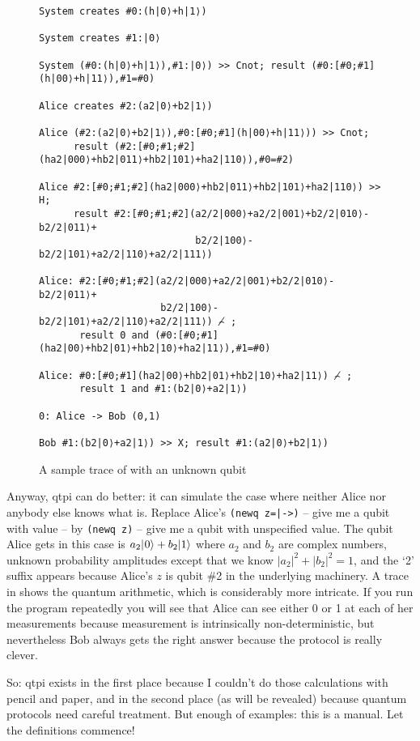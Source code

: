 \documentclass[11pt,a4paper]{article}
\newcommand{\verbtt}[1]{\texttt{\small{}#1}}
\begin{document}
\begin{figure}
\centering
\begin{verbatim}
System creates #0:(h|0⟩+h|1⟩)

System creates #1:|0⟩

System (#0:(h|0⟩+h|1⟩),#1:|0⟩) >> Cnot; result (#0:[#0;#1](h|00⟩+h|11⟩),#1=#0)

Alice creates #2:(a2|0⟩+b2|1⟩)

Alice (#2:(a2|0⟩+b2|1⟩),#0:[#0;#1](h|00⟩+h|11⟩)) >> Cnot; 
      result (#2:[#0;#1;#2](ha2|000⟩+hb2|011⟩+hb2|101⟩+ha2|110⟩),#0=#2)

Alice #2:[#0;#1;#2](ha2|000⟩+hb2|011⟩+hb2|101⟩+ha2|110⟩) >> H; 
      result #2:[#0;#1;#2](a2/2|000⟩+a2/2|001⟩+b2/2|010⟩-b2/2|011⟩+
                           b2/2|100⟩-b2/2|101⟩+a2/2|110⟩+a2/2|111⟩)

Alice: #2:[#0;#1;#2](a2/2|000⟩+a2/2|001⟩+b2/2|010⟩-b2/2|011⟩+
                     b2/2|100⟩-b2/2|101⟩+a2/2|110⟩+a2/2|111⟩) ⌢̸ ; 
       result 0 and (#0:[#0;#1](ha2|00⟩+hb2|01⟩+hb2|10⟩+ha2|11⟩),#1=#0)

Alice: #0:[#0;#1](ha2|00⟩+hb2|01⟩+hb2|10⟩+ha2|11⟩) ⌢̸ ; 
       result 1 and #1:(b2|0⟩+a2|1⟩)

0: Alice -> Bob (0,1)

Bob #1:(b2|0⟩+a2|1⟩) >> X; result #1:(a2|0⟩+b2|1⟩)
\end{verbatim}
\caption{A sample trace of  with an unknown qubit}
\end{figure}

Anyway, qtpi can do better: it can simulate the case where neither Alice nor anybody else knows what \bv{\phi} is. Replace Alice's \verbtt{(newq z=|->)} -- give me a qubit with value \minus{} -- by \verbtt{(newq z)} -- give me a qubit with unspecified value. The qubit Alice gets in this case is $a_{2}|\hspace{0.5pt}0\rangle+b_{2}|1\rangle$ where $a_{2}$ and $b_{2}$ are  complex numbers, unknown probability amplitudes except that we know $|a_{2}|^{2}+|b_{2}|^{2}=1$, and the `2' suffix appears because Alice's $z$ is qubit \#2 in the underlying machinery. A trace in  shows the quantum arithmetic, which is considerably more intricate. If you run the program repeatedly you will see that Alice can see either 0 or 1 at each of her measurements because measurement is intrinsically non-deterministic, but nevertheless Bob always gets the right answer because the protocol is really clever.

So: qtpi exists in the first place because I couldn't do those calculations with pencil and paper, and in the second place (as will be revealed) because quantum protocols need careful treatment. But enough of examples: this is a manual. Let the definitions commence!
\end{document}
